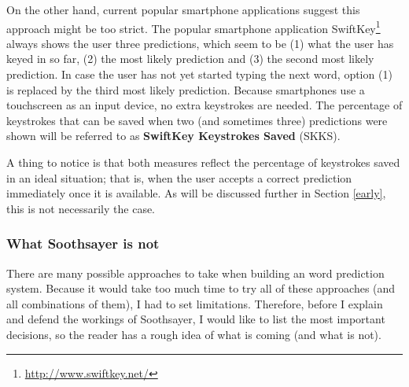 \documentclass[11pt]{article}
\begin{document}
On the other hand, current popular smartphone applications suggest this approach might be too strict. The popular smartphone application SwiftKey\footnote{\url{http://www.swiftkey.net/}} always shows the user three predictions, which seem to be (1) what the user has keyed in so far, (2) the most likely prediction and (3) the second most likely prediction. In case the user has not yet started typing the next word, option (1) is replaced by the third most likely prediction. Because smartphones use a touchscreen as an input device, no extra keystrokes are needed. The percentage of keystrokes that can be saved when two (and sometimes three) predictions were shown will be referred to as \textbf{SwiftKey Keystrokes Saved} (SKKS).

A thing to notice is that both measures reflect the percentage of keystrokes saved in an ideal situation; that is, when the user accepts a correct prediction immediately once it is available. As will be discussed further in Section \ref{early}, this is not necessarily the case. 

\subsubsection{What Soothsayer is not} \label{whatnot}
There are many possible approaches to take when building an word prediction system. Because it would take too much time to try all of these approaches (and all combinations of them), I had to set limitations. Therefore, before I explain and defend the workings of Soothsayer, I would like to list the most important decisions, so the reader has a rough idea of what is coming (and what is not). 
\end{document}
